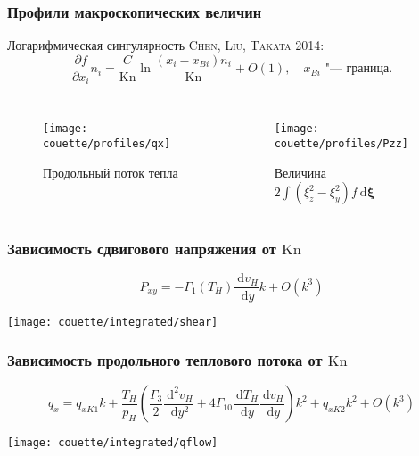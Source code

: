 \documentclass[mathserif]{beamer} %
\newcommand{\Kn}{\mathrm{Kn}}
\newcommand{\dd}{\:\mathrm{d}}
\newcommand{\der}[2][]{\frac{\dd#1}{\dd#2}}
\newcommand{\derdual}[2][]{\frac{\dd^2#1}{\dd#2^2}}
\newcommand{\pder}[2][]{\frac{\partial#1}{\partial#2}}
\newcommand{\dxi}{\boldsymbol{\dd\xi}}
\newcommand{\OO}[1]{O(#1)}
\newcommand{\Cite}[2][]{\alert{\textsc{#2 #1}}}
\begin{document}
\begin{frame}
    \frametitle{Профили макроскопических величин}
    Логарифмическая сингулярность \Cite[2014]{Chen, Liu, Takata}:
    \begin{equation}
        \pder[f]{x_i}n_i = \frac{C}{\Kn}\ln\frac{(x_i-x_{Bi})n_i}{\Kn} + \OO{1},
        \quad x_{Bi}\text{ "--- граница}.
    \end{equation}
    \vspace{-20pt}
    \begin{columns}
        \begin{figure}
            \texttt{[image: couette/profiles/qx]}\vspace{-10pt}
            \caption{Продольный поток тепла}
        \end{figure}
        \begin{figure}
            \texttt{[image: couette/profiles/Pzz]}\vspace{-10pt}
            \caption{Величина \(2\int(\xi_z^2-\xi_y^2)f\dxi\)}
        \end{figure}
    \end{columns}
\end{frame}

\begin{frame}
    \frametitle{Зависимость сдвигового напряжения от \(\Kn\)}
    \vspace{-10pt}
    \[ P_{xy} = -\Gamma_1(T_H)\der[v_H]{y}k + \OO{k^3} \]
    \vspace{-10pt}

    \centering\hspace{-1.5cm}
    \texttt{[image: couette/integrated/shear]}
    \hspace{-1.5cm}
\end{frame}

\begin{frame}
    \frametitle{Зависимость продольного теплового потока от \(\Kn\)}
    \vspace{-20pt}
    \[ q_x = q_{xK1}k
        + \frac{T_H}{p_H}\left( \frac{\Gamma_3}2 \derdual[v_H]{y}
            + 4\Gamma_{10} \der[T_H]{y}\der[v_H]{y} \right)k^2
        + q_{xK2}k^2 + \OO{k^3} \]
    \vspace{-10pt}

    \centering\hspace{-1.5cm}
    \texttt{[image: couette/integrated/qflow]}
    \hspace{-1.5cm}
\end{frame}
\end{document}
